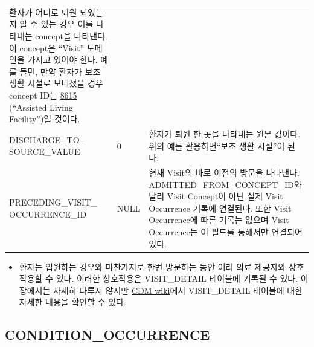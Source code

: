 \documentclass[11pt]{book}
\providecommand{\tightlist}{%
  \setlength{\itemsep}{0pt}\setlength{\parskip}{0pt}}
\theoremstyle{definition}
\theoremstyle{definition}
\theoremstyle{definition}
\theoremstyle{remark}
\begin{document}
\begin{longtable}[]{@{}lll@{}}
\begin{minipage}[t]{0.48\columnwidth}
환자가 어디로 퇴원 되었는지 알 수 있는 경우 이를 나타내는 concept을
나타낸다. 이 concept은 ``Visit'' 도메인을 가지고 있어야 한다. 예를 들면,
만약 환자가 보조 생활 시설로 보내졌을 경우 concept ID는
\href{http://athena.ohdsi.org/search-terms/terms/8615}{8615} (``Assisted
Living Facility'')일 것이다.\strut
\end{minipage}\tabularnewline
\begin{minipage}[t]{0.28\columnwidth}\raggedright\strut
DISCHARGE\_TO\_ SOURCE\_VALUE\strut
\end{minipage} & \begin{minipage}[t]{0.16\columnwidth}\raggedright\strut
0\strut
\end{minipage} & \begin{minipage}[t]{0.48\columnwidth}\raggedright\strut
환자가 퇴원 한 곳을 나타내는 원본 값이다. 위의 예를 활용하면``보조 생활
시설''이 된다.\strut
\end{minipage}\tabularnewline
\begin{minipage}[t]{0.28\columnwidth}\raggedright\strut
PRECEDING\_VISIT\_ OCCURRENCE\_ID\strut
\end{minipage} & \begin{minipage}[t]{0.16\columnwidth}\raggedright\strut
NULL\strut
\end{minipage} & \begin{minipage}[t]{0.48\columnwidth}\raggedright\strut
현재 Visit의 바로 이전의 방문을 나타낸다. ADMITTED\_FROM\_CONCEPT\_ID와
달리 Visit Concept이 아닌 실제 Visit Occurrence 기록에 연결된다. 또한
Visit Occurrence에 따른 기록는 없으며 Visit Occurrence는 이 필드를
통해서만 연결되어 있다.\strut
\end{minipage}\tabularnewline
\bottomrule
\end{longtable}

\begin{itemize}
\tightlist
\item
  환자는 입원하는 경우와 마찬가지로 한번 방문하는 동안 여러 의료
  제공자와 상호 작용할 수 있다. 이러한 상호작용은 VISIT\_DETAIL 테이블에
  기록될 수 있다. 이 장에서는 자세히 다루지 않지만
  \href{https://github.com/OHDSI/CommonDataModel/wiki/VISIT_DETAIL}{CDM
  wiki}에서 VISIT\_DETAIL 테이블에 대한 자세한 내용을 확인할 수 있다.
\end{itemize}

\subsection{CONDITION\_OCCURRENCE}\label{conditionOccurrence}
\end{document}
